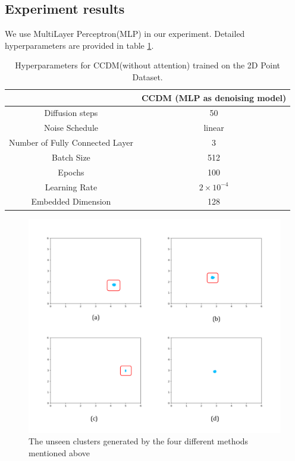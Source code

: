 \subsection{Experiment results}
We use MultiLayer Perceptron(MLP)\cite{taud2018multilayer} in our experiment. Detailed hyperparameters are provided in table \ref{tab:ccdm_mlp}.

\begin{table} [H]
    \centering
    \begin{tabular}{cc} 
         \hline
         & CCDM (MLP as denoising model) \\
         \hline
         Diffusion steps & 50\\
         Noise Schedule & linear \\
         Number of Fully Connected Layer & 3 \\
         Batch Size & 512 \\
         Epochs & 100 \\
         Learning Rate & $2 \times 10^{-4}$ \\
         Embedded Dimension & 128 \\
    \bottomrule[0.5mm]
    \end{tabular}
    \caption{Hyperparameters for CCDM(without attention) trained on the 2D Point Dataset.}
    \label{tab:ccdm_mlp}
\end{table}

\begin{figure} [H]
    \centering
    \includegraphics[width=0.8\linewidth]{figures/2dresult.pdf}
    \caption{The unseen clusters generated by the four different methods mentioned above}
    \label{fig:2dresult}
\end{figure}

